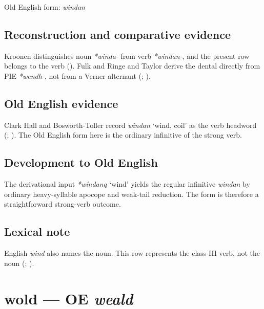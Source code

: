 \documentclass[
  british,
  a4paper,
  openany]{book}
\providecommand{\Recon}[1]{\emph{*#1}}
{\catcode`→=\active \global\def→{\ensuremath{\rightarrow}}}
\providecommand{\texorpdfstring}[2]{#1}
\providecommand{\Recon}[1]{\emph{*#1}}
{\catcode`→=\active \global\def→{\ensuremath{\rightarrow}}}
\begin{document}
Old English form: \emph{windan}

\subsection{Reconstruction and comparative
evidence}\label{reconstruction-and-comparative-evidence-67}

Kroonen distinguishes noun \emph{*winda-} from verb \emph{*windan-}, and
the present row belongs to the verb (). Fulk and Ringe and Taylor derive the dental directly from PIE
\emph{*wendh-}, not from a Verner alternant
(;
).

\subsection{Old English evidence}\label{old-english-evidence-67}

Clark Hall and Bosworth-Toller record {\emph{windan}} `wind, coil' as
the verb headword (;
). The
Old English form here is the ordinary infinitive of the strong verb.

\subsection{Development to Old
English}\label{development-to-old-english-67}

The derivational input \Recon{wíndaną} `wind' yields the regular
infinitive \emph{windan} by ordinary heavy-syllable apocope and
weak-tail reduction. The form is therefore a straightforward strong-verb
outcome.

\subsection{Lexical note}\label{lexical-note-5}

English \emph{wind} also names the noun. This row represents the
class-III verb, not the noun (;
).

\section{\texorpdfstring{wold --- OE
\emph{weald}}{wold --- OE weald}}\label{wold-oe-weald}
\end{document}
